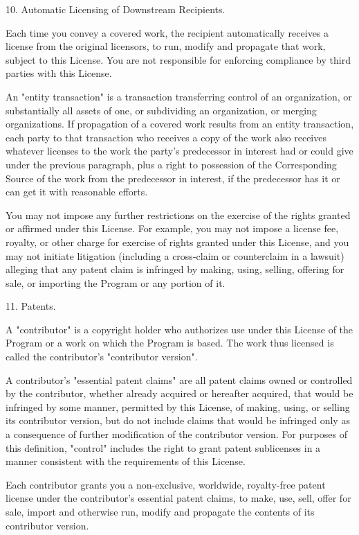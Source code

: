\documentclass[11pt]{book}
\begin{document}
    10. Automatic Licensing of Downstream Recipients.

    Each time you convey a covered work, the recipient automatically
    receives a license from the original licensors, to run, modify and
    propagate that work, subject to this License.  You are not responsible
    for enforcing compliance by third parties with this License.

    An "entity transaction" is a transaction transferring control of an
    organization, or substantially all assets of one, or subdividing an
    organization, or merging organizations.  If propagation of a covered
    work results from an entity transaction, each party to that
    transaction who receives a copy of the work also receives whatever
    licenses to the work the party's predecessor in interest had or could
    give under the previous paragraph, plus a right to possession of the
    Corresponding Source of the work from the predecessor in interest, if
    the predecessor has it or can get it with reasonable efforts.

    You may not impose any further restrictions on the exercise of the
    rights granted or affirmed under this License.  For example, you may
    not impose a license fee, royalty, or other charge for exercise of
    rights granted under this License, and you may not initiate litigation
    (including a cross-claim or counterclaim in a lawsuit) alleging that
    any patent claim is infringed by making, using, selling, offering for
    sale, or importing the Program or any portion of it.

    11. Patents.

    A "contributor" is a copyright holder who authorizes use under this
    License of the Program or a work on which the Program is based.  The
    work thus licensed is called the contributor's "contributor version".

    A contributor's "essential patent claims" are all patent claims
    owned or controlled by the contributor, whether already acquired or
    hereafter acquired, that would be infringed by some manner, permitted
    by this License, of making, using, or selling its contributor version,
    but do not include claims that would be infringed only as a
    consequence of further modification of the contributor version.  For
    purposes of this definition, "control" includes the right to grant
    patent sublicenses in a manner consistent with the requirements of
    this License.

    Each contributor grants you a non-exclusive, worldwide, royalty-free
    patent license under the contributor's essential patent claims, to
    make, use, sell, offer for sale, import and otherwise run, modify and
    propagate the contents of its contributor version.
\end{document}
